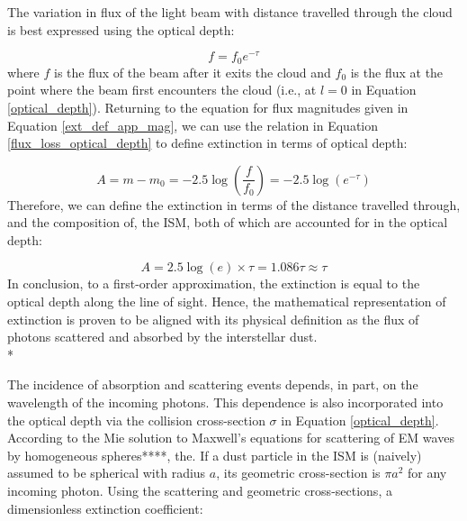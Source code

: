 \documentclass[12pt, a4paper]{report}
\begin{document}
The variation in flux of the light beam with distance travelled through the cloud is best expressed using the optical depth:

\begin{equation}
f = f_{0} e^{-\tau}
\label{flux_loss_optical_depth}
\end{equation}
where $f$ is the flux of the beam after it exits the cloud and $f_{0}$ is the flux at the point where the beam first encounters the cloud (i.e., at $l = 0$ in Equation \ref{optical_depth}). Returning to the equation for flux magnitudes given in Equation \ref{ext_def_app_mag}, we can use the relation in Equation \ref{flux_loss_optical_depth} to define extinction in terms of optical depth:

\begin{equation}
A = m - m_{0} = -2.5\log\left(\frac{f}{f_{0}}\right) = -2.5\log(e^{-\tau})
\label{ext_optical_depth_mags}
\end{equation}
Therefore, we can define the extinction in terms of the distance travelled through, and the composition of, the ISM, both of which are accounted for in the optical depth:

\begin{equation}
A = 2.5\log(e) \times \tau = 1.086\tau \approx \tau
\label{ext_optical_depth}
\end{equation}
In conclusion, to a first-order approximation, the extinction is equal to the optical depth along the line of sight. Hence, the mathematical representation of extinction is proven to be aligned with its physical definition as the flux of photons scattered and absorbed by the interstellar dust. \\*

The incidence of absorption and scattering events depends, in part, on the wavelength of the incoming photons. This dependence is also incorporated into the optical depth via the collision cross-section $\sigma$ in Equation \ref{optical_depth}. According to the Mie solution \citep{1908AnP...330..377M} to Maxwell's equations for scattering of EM waves by homogeneous spheres****, the. If a dust particle in the ISM is (naively) assumed to be spherical with radius $a$, its geometric cross-section is $\pi a^{2}$ for any incoming photon. Using the scattering and geometric cross-sections, a dimensionless extinction coefficient:
\end{document}
